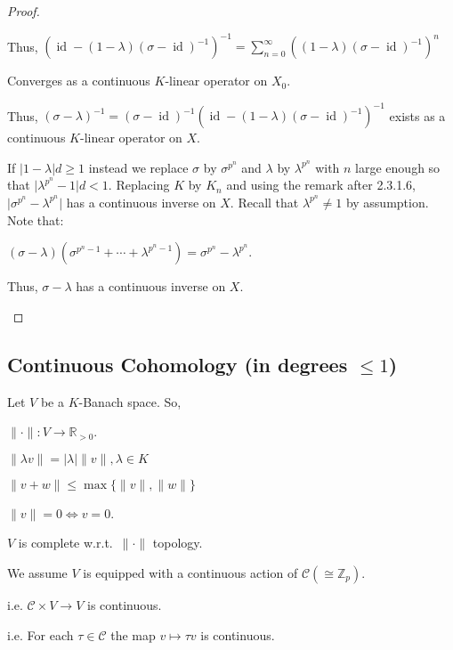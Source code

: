 \documentclass{article}
\theoremstyle{definition}
\numberwithin{theorem}{subsection}
\begin{document}
\begin{proof}
\begin{enumerate}[label=\alph*)]
            Thus, \((\operatorname{id} - (1-\lambda)(\sigma - \operatorname{id}) ^{-1}) ^{-1} = \sum_{n=0}^{\infty} ((1-\lambda) (\sigma - \operatorname{id})^{-1})^n\)
            
            Converges as a continuous \(K\)-linear operator on \(X_0\).

            Thus, \((\sigma - \lambda) ^{-1}  = (\sigma - \operatorname{id}) ^{-1} (\operatorname{id} - (1-\lambda)(\sigma - \operatorname{id}) ^{-1}) ^{-1}\) exists as a continuous \(K\)-linear operator on \(X\).

            If \(\vert 1-\lambda \vert d \geq 1\) instead we replace \(\sigma\) by \(\sigma^{p^n}\) and \(\lambda\) by \(\lambda^{p^n}\) with \(n\) large enough so that \(\vert \lambda^{p^n} - 1 \vert d < 1\). Replacing \(K\) by \(K_n\) and using the remark after 2.3.1.6, \(\vert \sigma^{p^n} - \lambda^{p^n} \vert\) has a continuous inverse on \(X\). Recall that \(\lambda^{p^n} \neq 1\) by assumption. Note that:

            \((\sigma - \lambda)(\sigma^{p^n - 1} + \cdots + \lambda^{p^n - 1}) = \sigma^{p^n} - \lambda^{p^n}\).
            
            Thus, \(\sigma - \lambda\) has a continuous inverse on \(X\).
        \end{enumerate} 
    \end{proof}

    \subsection*{Continuous Cohomology (in degrees \(\leq 1\))}

    Let \(V\) be a \(K\)-Banach space. So,

    \(\lVert \cdot \rVert: V \to \mathbb{R}_{> 0}\).

    \(\lVert \lambda v \rVert = \vert \lambda  \vert \lVert v \rVert, \lambda \in K\) 

    \(\lVert v + w \rVert \leq \max \{ \lVert v \rVert , \lVert w \rVert \}\)

    \(\lVert v \rVert = 0 \iff v = 0\).

    \(V\) is complete w.r.t.\ \(\lVert \cdot \rVert \) topology.

    We assume \(V\) is equipped with a continuous action of \(\mathscr{C} (\cong \mathbb{Z}_p)\).

    i.e. \(\mathscr{C} \times V \to V\) is continuous.

    i.e. For each \(\tau \in \mathscr{C}\) the map \(v \mapsto \tau v\) is continuous.
\end{document}
